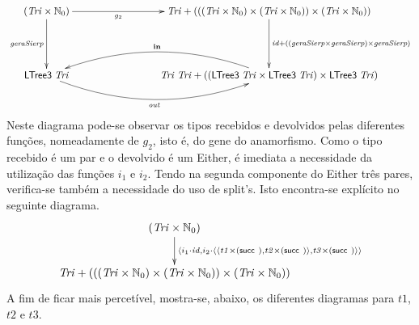 \documentclass[a4paper]{article}
\newcommand{\Conid}[1]{\mathit{#1}}
\newcommand{\Varid}[1]{\mathit{#1}}
\begin{document}
\begin{eqnarray*}
\xymatrix@C=3cm@R=1.7cm{
    \ensuremath{(\Conid{Tri}\times\N_0)}
           \ar[d]_-{\ensuremath{\Varid{geraSierp}}}
           \ar[r]_-{\ensuremath{g_2 }}
&
    \ensuremath{\Conid{Tri}\mathbin{+}(((\Conid{Tri}\times\N_0)\times(\Conid{Tri}\times\N_0))\times(\Conid{Tri}\times\N_0))}
           \ar[d]^{\ensuremath{\Varid{id}\mathbin{+}((\Varid{geraSierp}\times\Varid{geraSierp})\times\Varid{geraSierp})}}
\\
     \ensuremath{\mathsf{LTree3}\;\Conid{Tri}}
            \ar@/_2pc/[r]_-{\ensuremath{\Varid{out}}}
&
     \ensuremath{\Conid{Tri}\;\Conid{Tri}\mathbin{+}((\mathsf{LTree3}\;\Conid{Tri}\times\mathsf{LTree3}\;\Conid{Tri})\times\mathsf{LTree3}\;\Conid{Tri})}
           \ar@/_2pc/[l]_-{\ensuremath{\mathbf{in}}}
}
\end{eqnarray*}
Neste diagrama pode-se observar os tipos recebidos e devolvidos pelas diferentes
 funções, nomeadamente de \ensuremath{g_2 }, isto é, do gene do anamorfismo. Como o tipo
 recebido é um par e o devolvido é um Either, é imediata a necessidade da 
utilização das funções \ensuremath{i_1} e \ensuremath{i_2}. Tendo na segunda componente do Either três
 pares, verifica-se também a necessidade do uso de split's. Isto encontra-se
 explícito no seguinte diagrama.
\begin{eqnarray*}
\xymatrix@C=2cm{
    \ensuremath{(\Conid{Tri}\times\N_0)}
           \ar[d]^-{\ensuremath{\conj{i_1\comp \Varid{id}}{i_2\comp \conj{\conj{\Varid{t1}\times(\succ )}{\Varid{t2}\times(\succ )}}{\Varid{t3}\times(\succ )}}}}
\\
    \ensuremath{\Conid{Tri}\mathbin{+}(((\Conid{Tri}\times\N_0)\times(\Conid{Tri}\times\N_0))\times(\Conid{Tri}\times\N_0))}
}
\end{eqnarray*}
A fim de ficar mais percetível, mostra-se, abaixo, os diferentes diagramas para \ensuremath{\Varid{t1}}, \ensuremath{\Varid{t2}} e \ensuremath{\Varid{t3}}.
\end{document}

